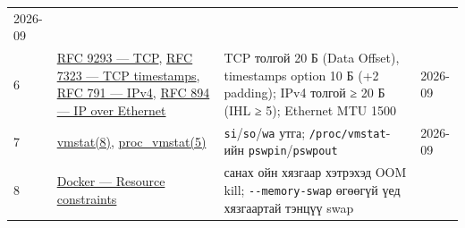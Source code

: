 \begin{longtable}[]{@{}llll@{}}
\begin{minipage}[t]{0.22\columnwidth}
2026-09\strut
\end{minipage}\tabularnewline
\begin{minipage}[t]{0.22\columnwidth}\raggedright
6\strut
\end{minipage} & \begin{minipage}[t]{0.22\columnwidth}\raggedright
\href{https://www.rfc-editor.org/rfc/rfc9293.txt}{RFC 9293 --- TCP}, \href{https://www.rfc-editor.org/rfc/rfc7323.txt}{RFC 7323 --- TCP timestamps}, \href{https://www.rfc-editor.org/rfc/rfc791.txt}{RFC 791 --- IPv4}, \href{https://www.rfc-editor.org/rfc/rfc894.txt}{RFC 894 --- IP over Ethernet}\strut
\end{minipage} & \begin{minipage}[t]{0.22\columnwidth}\raggedright
TCP толгой 20 Б (Data Offset), timestamps option 10 Б (+2 padding); IPv4 толгой ≥ 20 Б (IHL ≥ 5); Ethernet MTU 1500\strut
\end{minipage} & \begin{minipage}[t]{0.22\columnwidth}\raggedright
2026-09\strut
\end{minipage}\tabularnewline
\begin{minipage}[t]{0.22\columnwidth}\raggedright
7\strut
\end{minipage} & \begin{minipage}[t]{0.22\columnwidth}\raggedright
\href{https://man7.org/linux/man-pages/man8/vmstat.8.html}{vmstat(8)}, \href{https://man7.org/linux/man-pages/man5/proc_vmstat.5.html}{proc\_vmstat(5)}\strut
\end{minipage} & \begin{minipage}[t]{0.22\columnwidth}\raggedright
\texttt{si}/\allowbreak\texttt{so}/\allowbreak\texttt{wa} утга; \texttt{/proc/vmstat}-ийн \texttt{pswpin}/\allowbreak\texttt{pswpout}\strut
\end{minipage} & \begin{minipage}[t]{0.22\columnwidth}\raggedright
2026-09\strut
\end{minipage}\tabularnewline
\begin{minipage}[t]{0.22\columnwidth}\raggedright
8\strut
\end{minipage} & \begin{minipage}[t]{0.22\columnwidth}\raggedright
\href{https://docs.docker.com/engine/containers/resource_constraints/}{Docker --- Resource constraints}\strut
\end{minipage} & \begin{minipage}[t]{0.22\columnwidth}\raggedright
санах ойн хязгаар хэтрэхэд OOM kill; \texttt{-\/-memory-swap} өгөөгүй үед хязгаартай тэнцүү swap\strut

\end{minipage}
\end{longtable}
